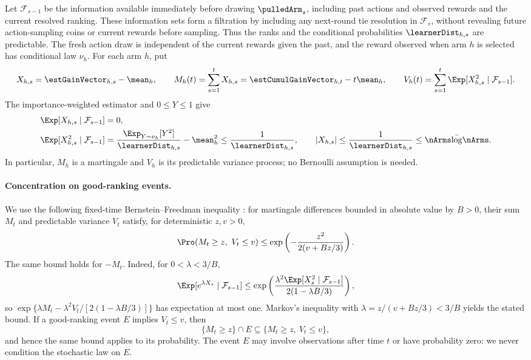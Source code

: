 Let $\mathcal F_{s-1}$ be the information available immediately
before drawing $\pulledArm_s$, including past actions and observed
rewards and the current resolved ranking. These information sets
form a filtration by including any next-round tie resolution in
$\mathcal F_s$, without revealing future action-sampling coins or
current rewards before sampling. Thus the ranks and the conditional
probabilities $\learnerDist_{h,s}$ are predictable. The fresh action
draw is independent of the current rewards given the past, and the
reward observed when arm $h$ is selected has conditional law $\nu_h$.
For each arm $h$, put
\[
X_{h,s}=\estGainVector_{h,s}-\mean_h,\qquad
M_h(t)=\sum_{s=1}^t X_{h,s}
=\estCumulGainVector_{h,t}-t\mean_h,\qquad
V_h(t)=\sum_{s=1}^t\Exp[X_{h,s}^2\mid\mathcal F_{s-1}].
\]
The importance-weighted estimator and $0\leq Y\leq1$ give
\begin{align*}
\Exp[X_{h,s}\mid\mathcal F_{s-1}]&=0,\\
\Exp[X_{h,s}^2\mid\mathcal F_{s-1}]
&=\frac{\Exp_{Y\sim\nu_h}[Y^2]}{\learnerDist_{h,s}}-\mean_h^2
\leq\frac1{\learnerDist_{h,s}},
\qquad
|X_{h,s}|\leq\frac1{\learnerDist_{h,s}}
\leq\nArms\bar\log\nArms.
\end{align*}
In particular, $M_h$ is a martingale and $V_h$ is its predictable
variance process; no Bernoulli assumption is needed.

\paragraph{Concentration on good-ranking events.}
We use the following fixed-time Bernstein--Freedman inequality
\citep{Freedman75OT}: for martingale differences bounded in absolute
value by $B>0$, their sum $M_t$ and predictable variance $V_t$ satisfy,
for deterministic $z,v>0$,
\[
\Pro(M_t\geq z,\ V_t\leq v)
\leq\exp\left(-\frac{z^2}{2(v+Bz/3)}\right).
\]
The same bound holds for $-M_t$. Indeed, for $0<\lambda<3/B$,
\[
\Exp[e^{\lambda X_s}\mid\mathcal F_{s-1}]
\leq\exp\left(
\frac{\lambda^2\Exp[X_s^2\mid\mathcal F_{s-1}]}
{2(1-\lambda B/3)}\right),
\]
so $\exp\{\lambda M_t-\lambda^2 V_t/[2(1-\lambda B/3)]\}$
has expectation at most one. Markov's inequality with
$\lambda=z/(v+Bz/3)<3/B$ yields the stated bound.
If a good-ranking event $E$ implies $V_t\leq v$, then
\[
\{M_t\geq z\}\cap E\subseteq\{M_t\geq z,\ V_t\leq v\},
\]
and hence the same bound applies to its probability. The event $E$
may involve observations after time $t$ or have probability zero:
we never condition the stochastic law on $E$.

